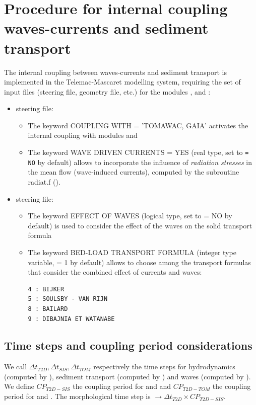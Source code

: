 \section{Procedure for internal coupling waves-currents and sediment transport}
The internal coupling between waves-currents and sediment transport is implemented in the Telemac-Mascaret modelling system, requiring the set of input files (steering file, geometry file, etc.) for the modules , \tomawac{} and \gaia{}:
\begin{itemize}
  \item {} steering file:
\begin{itemize}
\item The keyword {\ttfamily COUPLING WITH = 'TOMAWAC, GAIA'} activates the internal coupling with modules \tomawac{} and \gaia{}
\item The keyword {\ttfamily WAVE DRIVEN CURRENTS = YES} (real type, set to \texttt{= NO} by default) allows to incorporate the influence of \textit{radiation stresses} in the mean flow (wave-induced currents), computed by the subroutine {\ttfamily radiat.f} (\tomawac{}).
\end{itemize}

 \item \gaia{} steering file:
\begin{itemize}
\item The keyword {\ttfamily EFFECT OF WAVES} (logical type, set to {\ttfamily = NO} by default) is used to consider the effect of the waves on the solid transport formula
\item The keyword {\ttfamily BED-LOAD TRANSPORT FORMULA} (integer type variable, {\ttfamily = 1} by default) allows to choose among the transport formulas that consider the combined effect of currents and waves:
\begin{lstlisting}[frame=trBL]
4 : BIJKER
5 : SOULSBY - VAN RIJN
8 : BAILARD
9 : DIBAJNIA ET WATANABE
\end{lstlisting}
\end{itemize}
\end{itemize}

\subsection{Time steps and coupling period considerations}
We call $\Delta t_{T2D}, \Delta t_{SIS}, \Delta t_{TOM}$ respectively the time steps for hydrodynamics (computed by ), sediment transport (computed by \gaia{}) and waves (computed by \tomawac{}). We define $CP_{T2D-SIS}$ the coupling period for  and \gaia{} and $CP_{T2D-TOM}$ the coupling period for  and \tomawac{}. The morphological time step is $\rightarrow \Delta t_{T2D} \times CP_{T2D-SIS}$.

